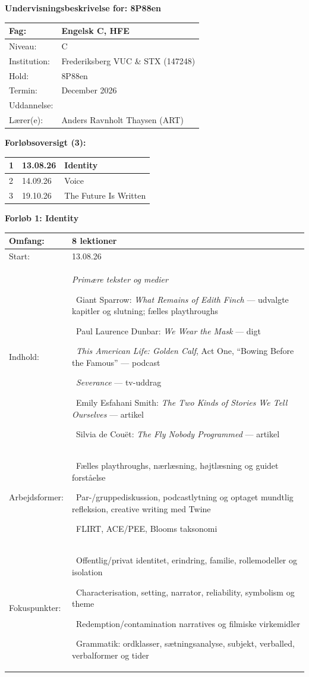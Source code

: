 \documentclass[10pt,a4paper]{article}
\newcommand{\ubheading}[1]{{\large\bfseries\overp\color{frbgreen}#1\par}}
\newcommand{\ubitem}[1]{\textbullet\ #1\par}
\newcommand{\ubgroup}[1]{\textit{#1}\par}
\newcommand{\unittable}[6]{%
  \vspace{1em}%
  \ubheading{#1}%
  \vspace{0.4em}%
  \begin{tabularx}{\linewidth}{|l|X|}
    \hline
    Omfang: & #3 \\\hline
    Start: & #2 \\\hline
    Indhold: & {\setlength{\parskip}{0pt}#4} \\\hline
    Arbejdsformer: & {\setlength{\parskip}{0pt}#5} \\\hline
    Fokuspunkter: & {\setlength{\parskip}{0pt}#6} \\\hline
  \end{tabularx}%
}
\begin{document}
\thispagestyle{plain}
\ubheading{Undervisningsbeskrivelse for: 8P88en}
\vspace{0.4em}
\begin{tabularx}{\linewidth}{|l|X|}
\hline
Fag: & Engelsk C, HFE\\\hline
Niveau: & C \\\hline
Institution: & Frederiksberg VUC \& STX (147248) \\\hline
Hold: & 8P88en \\\hline
Termin: & December 2026 \\\hline
Uddannelse: & \\\hline
Lærer(e): & Anders Ravnholt Thaysen (ART) \\\hline
\end{tabularx}

\vspace{1.5em}
\ubheading{Forløbsoversigt (3):}
\vspace{0.4em}
\begin{tabularx}{\linewidth}{|l|l|X|}
\hline
1 & 13.08.26 & Identity \\\hline
2 & 14.09.26 & Voice \\\hline
3 & 19.10.26 & The Future Is Written \\\hline
\end{tabularx}

\newpage
\unittable{Forløb 1: Identity}{13.08.26}{8 lektioner}{%
  \ubgroup{Primære tekster og medier}
  \ubitem{Giant Sparrow: \textit{What Remains of Edith Finch} --- udvalgte kapitler og slutning; fælles playthroughs}
  \ubitem{Paul Laurence Dunbar: \textit{We Wear the Mask} --- digt}
  \ubitem{\textit{This American Life: Golden Calf}, Act One, ``Bowing Before the Famous'' --- podcast}
  \ubitem{\textit{Severance} --- tv-uddrag}
  \ubitem{Emily Esfahani Smith: \textit{The Two Kinds of Stories We Tell Ourselves} --- artikel}
  \ubitem{Silvia de Couët: \textit{The Fly Nobody Programmed} --- artikel}
}{%
  \ubitem{Fælles playthroughs, nærlæsning, højtlæsning og guidet forståelse}
  \ubitem{Par-/gruppediskussion, podcastlytning og optaget mundtlig refleksion, creative writing med Twine}
  \ubitem{FLIRT, ACE/PEE, Blooms taksonomi}
}{%
  \ubitem{Offentlig/privat identitet, erindring, familie, rollemodeller og isolation}
  \ubitem{Characterisation, setting, narrator, reliability, symbolism og theme}
  \ubitem{Redemption/contamination narratives og filmiske virkemidler}
  \ubitem{Grammatik: ordklasser, sætningsanalyse, subjekt, verballed, verbalformer og tider}
}
\end{document}
